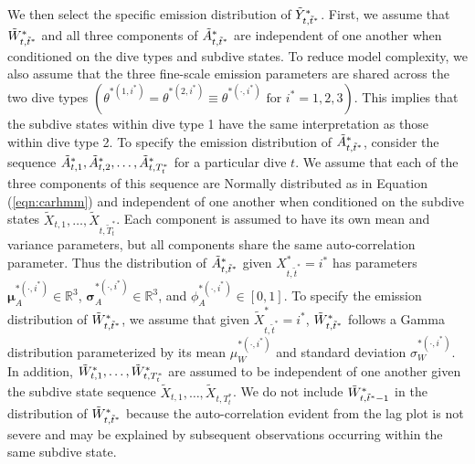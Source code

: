 We then select the specific emission distribution of $\tilde{Y}^*_{t,\tilde t^*}$. First, we assume that $\tilde{W}^*_{t,\tilde t^*}$ and all three components of $\tilde{A}^*_{t,\tilde t^*}$ are independent of one another when conditioned on the dive types and subdive states. To reduce model complexity, we also assume that the three fine-scale emission parameters are shared across the two dive types $\left(\theta^{*(1,i^*)} = \theta^{*(2,i^*)} \equiv \theta^{*(\cdot,i^*)} \text{ for } i^* = 1,2,3\right)$. This implies that the subdive states within dive type 1 have the same interpretation as those within dive type 2.
To specify the emission distribution of $\tilde{A}^*_{t,\tilde t^*}$, consider the sequence $\tilde{A}^*_{t,1},\tilde{A}^*_{t,2},\ldots,\tilde{A}^*_{t,T^*_t}$ for a particular dive $t$. We assume that each of the three components of this sequence are Normally distributed as in Equation (\ref{eqn:carhmm}) and independent of one another when conditioned on the subdive states $\tilde X_{t,1},\ldots,\tilde X_{t,\tilde T^*_t}$. Each component is assumed to have its own mean and variance parameters, but all components share the same auto-correlation parameter. Thus the distribution of $\tilde{A}^*_{t,\tilde t^*}$ given $X^*_{t,\tilde t^*} = i^*$ has parameters $\mathbf{\mu}_A^{*(\cdot,i^*)} \in \mathbb{R}^3$, $\mathbf{\sigma}_A^{*(\cdot,i^*)} \in \mathbb{R}^3$, and $\phi_A^{*(\cdot,i^*)} \in [0,1]$.
To specify the emission distribution of $\tilde{W}^*_{t,\tilde t^*}$, we assume that given $\tilde X^*_{t,\tilde t^*} = i^*$, $\tilde{W}^*_{t,\tilde t^*}$ follows a Gamma distribution parameterized by its mean $\mu_W^{*(\cdot,i^*)}$ and standard deviation $\sigma_W^{*(\cdot,i^*)}$. In addition, $\tilde{W}^*_{t,1},\ldots,\tilde{W}^*_{t,T^*_t}$ are assumed to be independent of one another given the subdive state sequence $\tilde X_{t,1}, \ldots, \tilde X_{t,T_t^*}$. We do not include $\tilde{W}^*_{t,\tilde t^*-1}$ in the distribution of $\tilde{W}^*_{t,\tilde t^*}$ because the auto-correlation evident from the lag plot is not severe and may be explained by subsequent observations occurring within the same subdive state. 
%

